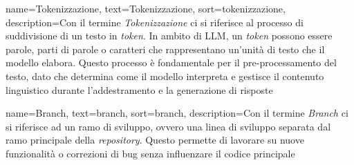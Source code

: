  {
    name=Tokenizzazione,
    text=Tokenizzazione,
    sort=tokenizzazione,
    description={Con il termine \emph{Tokenizzazione} ci si riferisce al processo di suddivisione di un testo in \textit{token}. In ambito di LLM, un \textit{token} possono essere parole, parti di parole o caratteri che rappresentano un'unità di testo che il modello elabora. Questo processo è fondamentale per il pre-processamento del testo, dato che determina come il modello interpreta e gestisce il contenuto linguistico durante l'addestramento e la generazione di risposte}
}



 {
    name=Branch,
    text=branch,
    sort=branch,
    description={Con il termine \emph{Branch} ci si riferisce ad un ramo di sviluppo, ovvero una linea di sviluppo separata dal ramo principale della \textit{repository}. Questo permette di lavorare su nuove funzionalità o correzioni di bug senza influenzare il codice principale}
}

